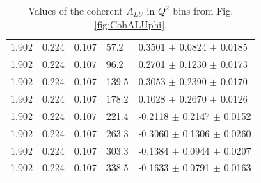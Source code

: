 \documentclass[aps,prc,preprint,superscriptaddress]{revtex4}
\begin{document}
\begin{table}[!h]
\begin{center}
\begin{tabular}{||l|l|l|l|l||}
  1.902 & 0.224 & 0.107 & 57.2  &  0.3501 $\pm$ 0.0824 $\pm$ 0.0185 \\ 
  1.902 & 0.224 & 0.107 & 96.2  &  0.2701 $\pm$ 0.1230 $\pm$ 0.0173 \\ 
  1.902 & 0.224 & 0.107 & 139.5 &  0.3053 $\pm$ 0.2390 $\pm$ 0.0170 \\ 
  1.902 & 0.224 & 0.107 & 178.2 &  0.1028 $\pm$ 0.2670 $\pm$ 0.0126 \\ 
  1.902 & 0.224 & 0.107 & 221.4 & -0.2118 $\pm$ 0.2147 $\pm$ 0.0152 \\ 
  1.902 & 0.224 & 0.107 & 263.3 & -0.3060 $\pm$ 0.1306 $\pm$ 0.0260 \\ 
  1.902 & 0.224 & 0.107 & 303.3 & -0.1384 $\pm$ 0.0944 $\pm$ 0.0207 \\ 
  1.902 & 0.224 & 0.107 & 338.5 & -0.1633 $\pm$ 0.0791 $\pm$ 0.0163 \\ 
         \hline \hline
      \end{tabular}
      \caption{Values of the coherent $A_{LU}$ in $Q^2$ bins from Fig. \ref{fig:CohALUphi}.}
      \label{table:Coh_Q2_BSA}
   \end{center}
\end{table}                    
\end{document}
